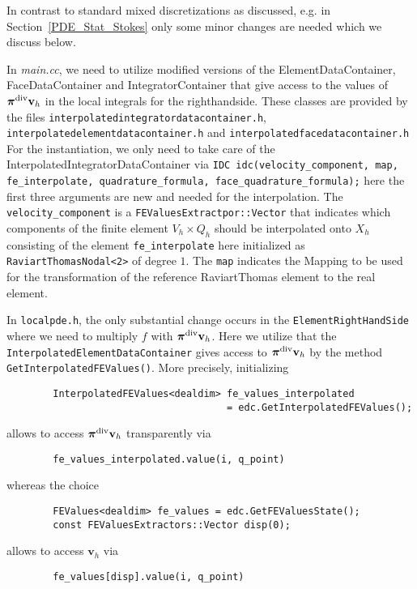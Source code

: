  In contrast to standard mixed discretizations as discussed, e.g. in Section~\ref{PDE_Stat_Stokes} only some minor changes are needed which we discuss below. 

In \textit{main.cc}, we need to utilize modified versions of the ElementDataContainer,
FaceDataContainer and IntegratorContainer that give access to the values of
$\bm{\pi}^{\rm{div}}\textbf{v}_h$ in the local integrals for the righthandside.  
These classes are provided by the files
\texttt{interpolatedintegratordatacontainer.h}, 
\texttt{interpolatedelementdatacontainer.h} and \texttt{interpolatedfacedatacontainer.h}
For the instantiation, we only need to take care of the InterpolatedIntegratorDataContainer
via
\texttt{IDC idc(velocity\_component, map, fe\_interpolate, quadrature\_formula, face\_quadrature\_formula);}
here the first three arguments are new and needed for the interpolation. The \texttt{velocity\_component} is a \texttt{FEValuesExtractpor::Vector} that indicates which components of the finite
element $V_h\times Q_h$ should be interpolated onto $X_h$ consisting of the element
\texttt{fe\_interpolate} here initialized as \texttt{RaviartThomasNodal<2>} of degree $1$.
The \texttt{map} indicates the Mapping to be used for the transformation of the reference
RaviartThomas element to the real element.

In \texttt{localpde.h}, the only substantial change occurs in the
\texttt{ElementRightHandSide} where we need to multiply $f$ with
$\bm{\pi}^{\rm{div}} \textbf{v}_h$.
Here we utilize that the \texttt{InterpolatedElementDataContainer} gives access to $\bm{\pi}^{\rm{div}} \textbf{v}_h$ by the method \texttt{GetInterpolatedFEValues()}.
More precisely, initializing 
\begin{verbatim}
        InterpolatedFEValues<dealdim> fe_values_interpolated 
                                      = edc.GetInterpolatedFEValues();   
\end{verbatim}                
allows to access $\bm{\pi}^{\rm{div}} \textbf{v}_h$ transparently via
\begin{verbatim}
        fe_values_interpolated.value(i, q_point)
\end{verbatim}
whereas the choice 
\begin{verbatim}
        FEValues<dealdim> fe_values = edc.GetFEValuesState(); 
        const FEValuesExtractors::Vector disp(0);
\end{verbatim}                
allows to access $\textbf{v}_h$ via
\begin{verbatim}
        fe_values[disp].value(i, q_point)
\end{verbatim}

   


